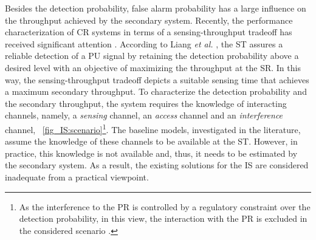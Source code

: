 

Besides the detection probability, false alarm probability has a large influence on the throughput achieved by the secondary system. %
Recently, the performance characterization of CR systems in terms of a sensing-throughput tradeoff has received significant attention \cite{Liang08, Juarez11, Sharkasi12, Pradhan15}. According to Liang \textit{et al.} \cite{Liang08}, the ST assures a reliable detection of a PU signal by retaining the detection probability above a desired level with an objective of maximizing the throughput at the SR. In this way, the sensing-throughput tradeoff depicts a suitable sensing time that achieves a maximum secondary throughput. To characterize the detection probability and the secondary throughput, the system requires the knowledge of interacting channels, namely, a \textit{sensing} channel, an \textit{access} channel and an \textit{interference} channel,  \figurename~\ref{fig_IS:scenario}\footnote{As the interference to the PR is controlled by a regulatory constraint over the detection probability, in this view, the interaction with the PR is excluded in the considered scenario \cite{Liang08}.}. The baseline models, investigated in the literature, assume the knowledge of these channels to be available at the ST. 
However, in practice, this knowledge is not available and, thus, it needs to be estimated by the secondary system. As a result, the existing solutions for the IS are considered inadequate from a practical viewpoint. 


